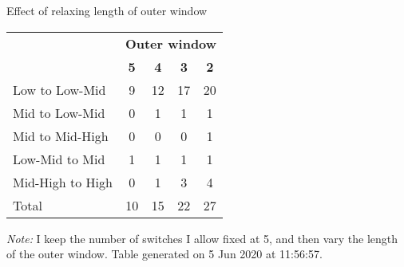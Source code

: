 \begin{center}
\begin{threeparttable}[!h]
\caption{Effect of relaxing length of outer window}
\begin{tabular}{lcccc}
\toprule
\toprule
& \multicolumn{4}{c}{\textbf{Outer window}} \\
\cline{2-5}
\textbf{}&\multicolumn{1}{c}{\textbf{5}}&\multicolumn{1}{c}{\textbf{4}}&\multicolumn{1}{c}{\textbf{3}}&\multicolumn{1}{c}{\textbf{2}} \\
\midrule
\midrule
Low to Low-Mid&9&12&17&20 \\
Mid to Low-Mid&0&1&1&1 \\
Mid to Mid-High&0&0&0&1 \\
Low-Mid to Mid&1&1&1&1 \\
Mid-High to High&0&1&3&4 \\
Total&10&15&22&27 \\
\bottomrule
\bottomrule
\end{tabular}
\begin{tablenotes}
\item \footnotesize \textit{Note:} I keep the number of switches I allow fixed at 5, and then vary the length of the outer window. Table generated on  5 Jun 2020 at 11:56:57.
\end{tablenotes}
\end{threeparttable}
\end{center}
